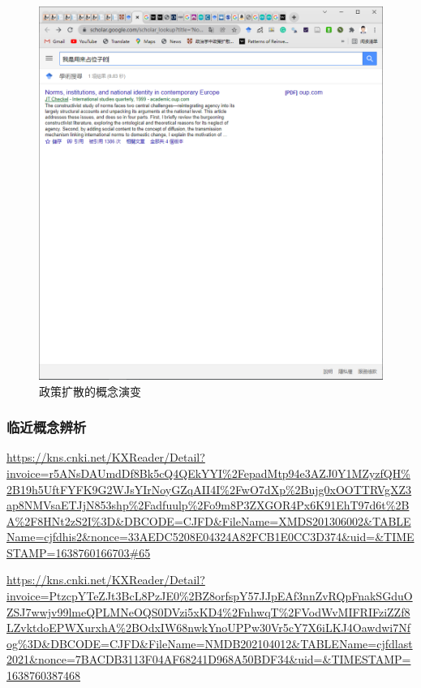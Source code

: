 \documentclass[
  12pt,
]{ctexart}
\begin{document}
\begin{figure}
\includegraphics[width=1\linewidth]{../figures/政策扩散的概念演变} \caption{政策扩散的概念演变}\label{fig:unnamed-chunk-3}
\end{figure}

\hypertarget{ux4e34ux8fd1ux6982ux5ff5ux8fa8ux6790}{%
\subsubsection{临近概念辨析}\label{ux4e34ux8fd1ux6982ux5ff5ux8fa8ux6790}}

\url{https://kns.cnki.net/KXReader/Detail?invoice=r5ANsDAUmdDf8Bk5cQ4QEkYYI\%2FepadMtp94e3AZJ0Y1MZyzfQH\%2B19h5UftFYFK9G2WJsYIrNoyGZqAII4I\%2FwO7dXp\%2Bujg0xOOTTRVgXZ3ap8NMVsaETJjN853shp\%2Fadfuulp\%2Fo9m8P3ZXGOR4Px6K91EhT97d6t\%2BA\%2F8HNt2zS2I\%3D\&DBCODE=CJFD\&FileName=XMDS201306002\&TABLEName=cjfdhis2\&nonce=33AEDC5208E04324A82FCB1E0CC3D374\&uid=\&TIMESTAMP=1638760166703\#65}

\url{https://kns.cnki.net/KXReader/Detail?invoice=PtzcpYTeZJt3BcL8PzJE0\%2BZ8orfspY57JJpEAf3nnZvRQpFnakSGduOZSJ7wwjv99lmeQPLMNeOQS0DVzi5xKD4\%2FnhwqT\%2FVodWvMIFRIFziZZf8LZvktdoEPWXurxhA\%2BOdxIW68nwkYnoUPPw30Vr5cY7X6iLKJ4Oawdwi7Nfog\%3D\&DBCODE=CJFD\&FileName=NMDB202104012\&TABLEName=cjfdlast2021\&nonce=7BACDB3113F04AF68241D968A50BDF34\&uid=\&TIMESTAMP=1638760387468}
\end{document}
